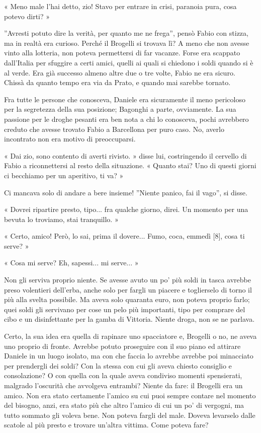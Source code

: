 « Meno male l'hai detto, zio! Stavo per entrare in crisi, paranoia pura, cosa potevo dirti? »

''Avresti potuto dire la verità, per quanto me ne frega'', pensò Fabio con stizza, ma in realtà era curioso. Perché il Brogelli si trovava lì? A meno che non avesse vinto alla lotteria, non poteva permettersi di far vacanze. Forse era scappato dall'Italia per sfuggire a certi amici, quelli ai quali si chiedono i soldi quando si è al verde. Era già successo almeno altre due o tre volte, Fabio ne era sicuro. Chissà da quanto tempo era via da Prato, e quando mai sarebbe tornato.

Fra tutte le persone che conosceva, Daniele era sicuramente il meno pericoloso per la segretezza della sua posizione; Bagonghi a parte, ovviamente. La sua passione per le droghe pesanti era ben nota a chi lo conosceva, pochi avrebbero creduto che avesse trovato Fabio a Barcellona per puro caso. No, averlo incontrato non era motivo di preoccuparsi.

« Dai zio, sono contento di averti rivisto. » disse lui, costringendo il cervello di Fabio a riconnettersi al resto della situazione. « Quanto stai? Uno di questi giorni ci becchiamo per un aperitivo, ti va? »

Ci mancava solo di andare a bere insieme! ''Niente panico, fai il vago'', si disse.

« Dovrei ripartire presto, tipo... fra qualche giorno, direi. Un momento per una bevuta lo troviamo, stai tranquillo. »

« Certo, amico! Però, lo sai, prima il dovere... Fumo, coca, emmedì [8], cosa ti serve? »

« Cosa mi serve? Eh, sapessi... mi serve... »

Non gli serviva proprio niente. Se avesse avuto un po' più soldi in tasca avrebbe preso volentieri dell'erba, anche solo per fargli un piacere e toglierselo di torno il più alla svelta possibile. Ma aveva solo quaranta euro, non poteva proprio farlo; quei soldi gli servivano per cose un pelo più importanti, tipo per comprare del cibo e un disinfettante per la gamba di Vittoria. Niente droga, non se ne parlava.

Certo, la sua idea era quella di rapinare uno spacciatore e, Brogelli o no, ne aveva uno proprio di fronte. Avrebbe potuto proseguire con il suo piano ed attirare Daniele in un luogo isolato, ma con che faccia lo avrebbe avrebbe poi minacciato per prendergli dei soldi? Con la stessa con cui gli aveva chiesto consiglio e consolazione? O con quella con la quale aveva condiviso momenti spensierati, malgrado l'oscurità che avvolgeva entrambi? Niente da fare: il Brogelli era un amico. Non era stato certamente l'amico su cui puoi sempre contare nel momento del bisogno, anzi, era stato più che altro l'amico di cui un po' di vergogni, ma tutto sommato gli voleva bene. Non poteva fargli del male. Doveva levarselo dalle scatole al più presto e trovare un'altra vittima. Come poteva fare?

